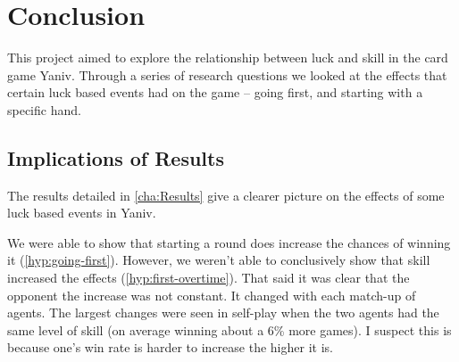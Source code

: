 \documentclass[../main.tex]{subfiles}
\begin{document}
\chapter{Conclusion}
\label{cha:Conclusion}



This project aimed to explore the relationship between luck and skill in the card game Yaniv. Through a series of research questions we looked at the effects that certain luck based events had on the game  -- going first, and starting with a specific hand.

\section{Implications of Results}
The results detailed in \cref{cha:Results} give a clearer picture on the effects of some luck based events in Yaniv.

We were able to show that starting a round does increase the chances of winning it (\cref{hyp:going-first}). However, we weren't able to conclusively show that skill increased the effects (\cref{hyp:first-overtime}). That said it was clear that the opponent the increase was not constant. It changed with each match-up of agents. The largest changes were seen in self-play when the two agents had the same level of skill (on average winning about a 6\% more games). I suspect this is because one's win rate is harder to increase the higher it is. 
\end{document}
